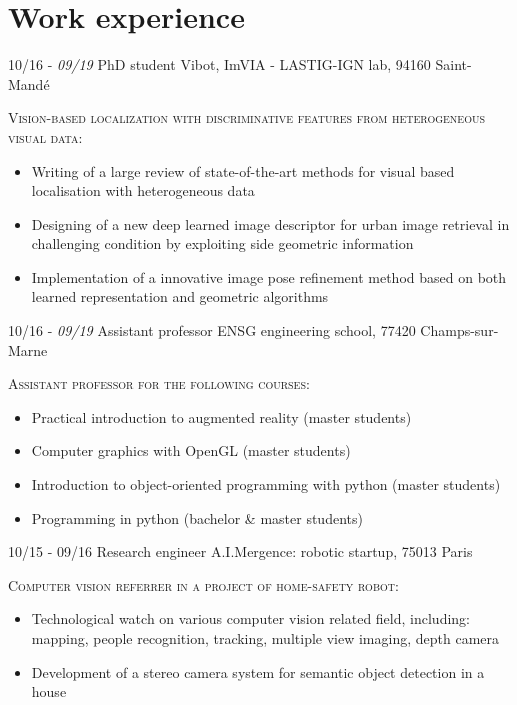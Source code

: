 \documentclass[]{friggeri-cv-cust}
\begin{document}
\section{Work experience}
\begin{entrylist}
  \entry
    {\small{10/16 - \textit{09/19}}}
    {PhD student}
    {Vibot, ImVIA - LASTIG-IGN lab, 94160 Saint-Mandé}
    {\textsc{Vision-based localization with discriminative features from heterogeneous visual data:}
    \begin{itemize}[label=$\rhd$]
    	\item Writing of a large review of state-of-the-art methods for visual based localisation with heterogeneous data
        \item Designing of a new deep learned image descriptor for urban image retrieval in challenging condition by exploiting side geometric information
        \item Implementation of a innovative image pose refinement method based on both learned representation and geometric algorithms
    \end{itemize}
    }
  \entry
    {\small{10/16 - \textit{09/19}}}
    {Assistant professor}
    {ENSG engineering school, 77420 Champs-sur-Marne}
    {\textsc{Assistant professor for the following courses:}
    \begin{itemize}[label=$\rhd$]
        \item Practical introduction to augmented reality (master students)
        \item Computer graphics with OpenGL (master students)
   		\item Introduction to object-oriented programming with python (master students)
        \item Programming in python (bachelor \& master students)
    \end{itemize}
    }
  \entry
    {\small{10/15 - 09/16}}
    {Research engineer}
    {A.I.Mergence: robotic startup, 75013 Paris}
    {\textsc{Computer vision referrer in a project of home-safety robot:}
    \begin{itemize}[label=$\rhd$]
    	\item Technological watch on various computer vision related field, including: mapping, people recognition, tracking, multiple view imaging, depth camera
    	\item Development of a stereo camera system for semantic object detection in a house

\end{itemize}}
\end{entrylist}
\end{document}
